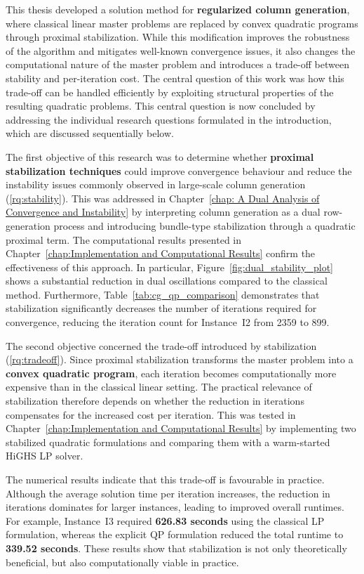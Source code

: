 \documentclass{book}
\theoremstyle{definition}
\newcounter{algorithm_}
\numberwithin{algorithm_}{chapter}
\begin{document}
{This thesis developed a solution method for \textbf{regularized column generation}, where classical linear master problems are replaced by convex quadratic programs through proximal stabilization. While this modification improves the robustness of the algorithm and mitigates well-known convergence issues, it also changes the computational nature of the master problem and introduces a trade-off between stability and per-iteration cost. The central question of this work was how this trade-off can be handled efficiently by exploiting structural properties of the resulting quadratic problems.
This central question is now concluded by addressing the individual research questions formulated in the introduction, which are discussed sequentially below.

\bigskip

The first objective of this research was to determine whether \textbf{proximal stabilization techniques} could improve convergence behaviour and reduce the instability issues commonly observed in large-scale column generation (\ref{rq:stability}). This was addressed in Chapter~\ref{chap: A Dual Analysis of Convergence and Instability} by interpreting column generation as a dual row-generation process and introducing bundle-type stabilization through a quadratic proximal term. The computational results presented in Chapter~\ref{chap:Implementation and Computational Results} confirm the effectiveness of this approach. In particular, Figure~\ref{fig:dual_stability_plot} shows a substantial reduction in dual oscillations compared to the classical method. Furthermore, Table~\ref{tab:cg_qp_comparison} demonstrates that stabilization significantly decreases the number of iterations required for convergence, reducing the iteration count for Instance~I2 from 2359 to 899.

\bigskip

The second objective concerned the trade-off introduced by stabilization (\ref{rq:tradeoff}). Since proximal stabilization transforms the master problem into a \textbf{convex quadratic program}, each iteration becomes computationally more expensive than in the classical linear setting. The practical relevance of stabilization therefore depends on whether the reduction in iterations compensates for the increased cost per iteration. This was tested in Chapter~\ref{chap:Implementation and Computational Results} by implementing two stabilized quadratic formulations and comparing them with a warm-started HiGHS LP solver.

The numerical results indicate that this trade-off is favourable in practice. Although the average solution time per iteration increases, the reduction in iterations dominates for larger instances, leading to improved overall runtimes. For example, Instance~I3 required \textbf{626.83 seconds} using the classical LP formulation, whereas the explicit QP formulation reduced the total runtime to \textbf{339.52 seconds}. These results show that stabilization is not only theoretically beneficial, but also computationally viable in practice.

}
\end{document}

